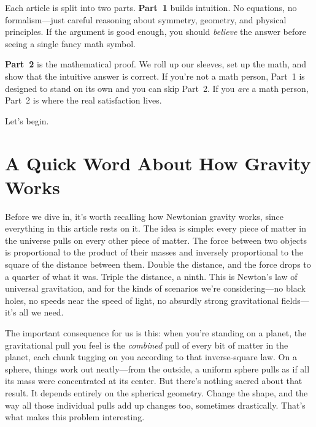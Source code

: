 \documentclass[11pt, letterpaper]{article}
\begin{document}
Each article is split into two parts. \textbf{Part~1} builds intuition. No equations, no formalism---just careful reasoning about symmetry, geometry, and physical principles. If the argument is good enough, you should \textit{believe} the answer before seeing a single fancy math symbol.

\textbf{Part~2} is the mathematical proof. We roll up our sleeves, set up the math, and show that the intuitive answer is correct. If you're not a math person, Part~1 is designed to stand on its own and you can skip Part~2. If you \textit{are} a math person, Part~2 is where the real satisfaction lives.

Let's begin.

\newpage


\section*{A Quick Word About How Gravity Works}

Before we dive in, it's worth recalling how Newtonian gravity works, since everything in this article rests on it. The idea is simple: every piece of matter in the universe pulls on every other piece of matter. The force between two objects is proportional to the product of their masses and inversely proportional to the square of the distance between them. Double the distance, and the force drops to a quarter of what it was. Triple the distance, a ninth. This is Newton's law of universal gravitation, and for the kinds of scenarios we're considering---no black holes, no speeds near the speed of light, no absurdly strong gravitational fields---it's all we need.

The important consequence for us is this: when you're standing on a planet, the gravitational pull you feel is the \textit{combined} pull of every bit of matter in the planet, each chunk tugging on you according to that inverse-square law. On a sphere, things work out neatly---from the outside, a uniform sphere pulls as if all its mass were concentrated at its center. But there's nothing sacred about that result. It depends entirely on the spherical geometry. Change the shape, and the way all those individual pulls add up changes too, sometimes drastically. That's what makes this problem interesting.

\end{document}
